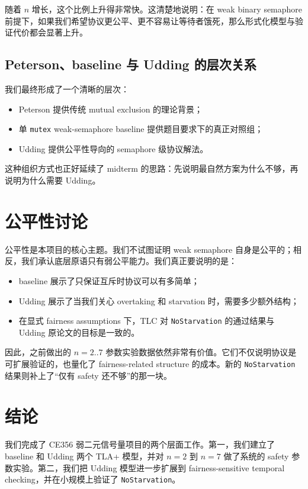 \documentclass[11pt]{ctexart}
\begin{document}
随着 $n$ 增长，这个比例上升得非常快。这清楚地说明：在 weak binary semaphore 前提下，如果我们希望协议更公平、更不容易让等待者饿死，那么形式化模型与验证代价都会显著上升。

\subsection{Peterson、baseline 与 Udding 的层次关系}

我们最终形成了一个清晰的层次：

\begin{itemize}
  \item Peterson 提供传统 mutual exclusion 的理论背景；
  \item 单 \texttt{mutex} weak-semaphore baseline 提供题目要求下的真正对照组；
  \item Udding 提供公平性导向的 semaphore 级协议解法。
\end{itemize}

这种组织方式也正好延续了 midterm 的思路：先说明最自然方案为什么不够，再说明为什么需要 Udding。

\section{公平性讨论}

公平性是本项目的核心主题。我们不试图证明 weak semaphore 自身是公平的；相反，我们承认底层原语只有弱公平能力。我们真正要说明的是：

\begin{itemize}
  \item baseline 展示了只保证互斥时协议可以有多简单；
  \item Udding 展示了当我们关心 overtaking 和 starvation 时，需要多少额外结构；
  \item 在显式 fairness assumptions 下，TLC 对 \texttt{NoStarvation} 的通过结果与 Udding 原论文的目标是一致的。
\end{itemize}

因此，之前做出的 $n=2..7$ 参数实验数据依然非常有价值。它们不仅说明协议是可扩展验证的，也量化了 fairness-related structure 的成本。新的 \texttt{NoStarvation} 结果则补上了“仅有 safety 还不够”的那一块。

\section{结论}

我们完成了 CE356 弱二元信号量项目的两个层面工作。第一，我们建立了 baseline 和 Udding 两个 TLA+ 模型，并对 $n=2$ 到 $n=7$ 做了系统的 safety 参数实验。第二，我们把 Udding 模型进一步扩展到 fairness-sensitive temporal checking，并在小规模上验证了 \texttt{NoStarvation}。
\end{document}
